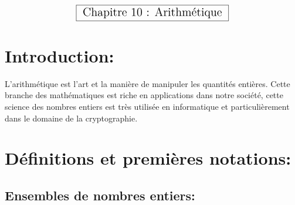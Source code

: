 \documentclass[a4paper,10.5pt]{article}
\begin{document}

	$$\fbox{\text{\Large{ Chapitre 10 : Arithmétique }}}$$
	
\section*{Introduction:}
L'arithmétique est l'art et la manière de manipuler les quantités entières. Cette branche des mathématiques est riche en applications dans notre société, cette science des nombres entiers est très utilisée en informatique et particulièrement dans le domaine de la cryptographie. %


\section{Définitions et premières notations:}
\subsection{Ensembles de nombres entiers:}
\end{document}

